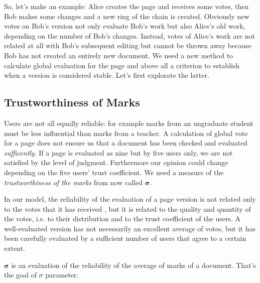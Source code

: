 \documentclass[a4paper,11pt]{article}
\newcommand{\sg}{$\sigma$ }
\begin{document}
So, let's make an example: Alice creates the page and receives some votes, then Bob makes 
some changes and a new ring of the chain is created. Obviously new votes on Bob's version 
not only evaluate Bob's work but also Alice's old work, depending on the number of Bob's 
changes. Instead, votes of Alice's work are not related at all with Bob's subsequent editing 
but cannot be thrown away because Bob has not created an entirely new document. We need a 
new method to calculate global evaluation for the page and above all a criterion to 
establish when a version is considered stable. Let's first explorate the latter.

\subsection{Trustworthiness of Marks} \label{sec:sigma}
Users are not all equally reliable: for example marks from an ungraduate student must be less influential than marks from a teacher. A calculation of global vote for a page does not ensure us that a document has been checked and evaluated \emph{sufficently}. If a page is evaluated as nine but by five users only, we are not satisfied by the level of judgment. Furthermore our opinion could change depending on the five users' trust coefficient. We need a measure of the \emph{trustworthiness of the marks} from now called $\boldsymbol{\sigma}$.

In our model, the reliability of the evaluation of a page version is not related only to the votes that it has received , but it is related to the quality and quantity of the votes, i.e. to their distribution and to the trust coefficient of the users. A well-evaluated version has not necessarily an excellent average of votes, but it has been carefully evaluated by a sufficient number of users that agree to a certain extent.

$\boldsymbol{\sigma}$ is an evaluation of the reliability of the average of marks of a document. That's the goal of \sg parameter.
\end{document}
